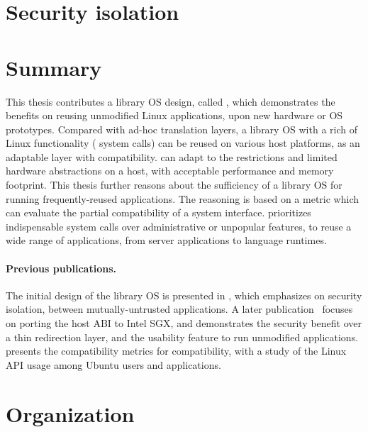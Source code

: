 \section{Security isolation}
\label{sec:intro:security}





\section{Summary}

This thesis contributes a library OS design, called \graphene{},
which demonstrates the benefits on reusing unmodified Linux applications, upon new hardware or OS prototypes.
Compared with ad-hoc translation layers,
a library OS with a rich of Linux functionality (\graphenesyscallnum{} system calls) can be reused on various host platforms, as an adaptable layer with compatibility.
\graphene{} can adapt to the restrictions and
limited hardware abstractions on a host, with acceptable performance and memory footprint.
This thesis further reasons about the sufficiency of a library OS
for running frequently-reused applications. The reasoning is based on a metric which can evaluate the partial compatibility of a system interface.
\graphene{} prioritizes indispensable system calls over administrative or unpopular features,
to reuse a wide range of applications, from server applications to language runtimes.


\paragraph{Previous publications.}
The initial design of the \graphene{} library OS is presented in \cite{tsai14graphene}, which emphasizes on security isolation, between mutually-untrusted applications.
A later publication~\cite{tsai17graphene-sgx} focuses on porting the host ABI
to Intel SGX, and demonstrates the security benefit 
over a thin redirection layer, and the usability feature to run unmodified applications.
\cite{tsai16apistudy} presents the compatibility metrics for compatibility,
with a study of the Linux API usage among Ubuntu users and applications.

\section{Organization}

